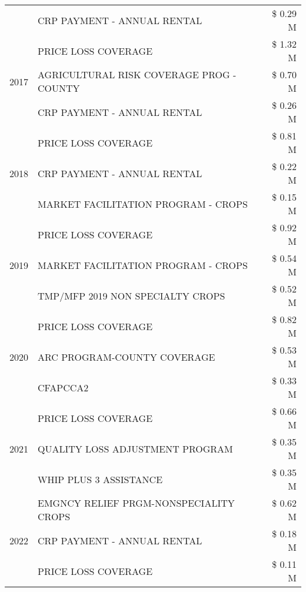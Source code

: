 \begin{tabular}{llr}
 & CRP PAYMENT - ANNUAL RENTAL & \$ 0.29 M \\
\cline{1-3}
\multirow[t]{3}{*}{2017} & PRICE LOSS COVERAGE & \$ 1.32 M \\
 & AGRICULTURAL RISK COVERAGE PROG - COUNTY & \$ 0.70 M \\
 & CRP PAYMENT - ANNUAL RENTAL & \$ 0.26 M \\
\cline{1-3}
\multirow[t]{3}{*}{2018} & PRICE LOSS COVERAGE & \$ 0.81 M \\
 & CRP PAYMENT - ANNUAL RENTAL & \$ 0.22 M \\
 & MARKET FACILITATION PROGRAM - CROPS & \$ 0.15 M \\
\cline{1-3}
\multirow[t]{3}{*}{2019} & PRICE LOSS COVERAGE & \$ 0.92 M \\
 & MARKET FACILITATION PROGRAM - CROPS & \$ 0.54 M \\
 & TMP/MFP 2019 NON SPECIALTY CROPS & \$ 0.52 M \\
\cline{1-3}
\multirow[t]{3}{*}{2020} & PRICE LOSS COVERAGE & \$ 0.82 M \\
 & ARC PROGRAM-COUNTY COVERAGE & \$ 0.53 M \\
 & CFAPCCA2 & \$ 0.33 M \\
\cline{1-3}
\multirow[t]{3}{*}{2021} & PRICE LOSS COVERAGE & \$ 0.66 M \\
 & QUALITY LOSS ADJUSTMENT PROGRAM & \$ 0.35 M \\
 & WHIP PLUS 3 ASSISTANCE & \$ 0.35 M \\
\cline{1-3}
\multirow[t]{3}{*}{2022} & EMGNCY RELIEF PRGM-NONSPECIALITY CROPS & \$ 0.62 M \\
 & CRP PAYMENT - ANNUAL RENTAL & \$ 0.18 M \\
 & PRICE LOSS COVERAGE & \$ 0.11 M \\
\cline{1-3}
\bottomrule
\end{tabular}
